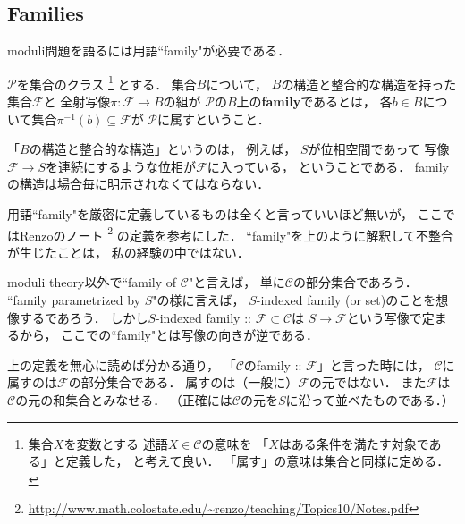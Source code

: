 \documentclass[a4paper]{jsarticle}
\newcommand{\famF}{\mathcal{F}}
\begin{document}
    \subsection{Families}
    moduli問題を語るには用語``family"が必要である．

    \begin{Def}
        $\mathcal{P}$を集合のクラス
        \footnote
        {
            集合$X$を変数とする
            述語$X \in \mathcal{C}$の意味を
            「$X$はある条件を満たす対象である」と定義した，
            と考えて良い．
            「属す」の意味は集合と同様に定める．
        }
        とする．
        集合$B$について，
        $B$の構造と整合的な構造を持った集合$\famF$と
        全射写像$\pi: \famF \to B$の組が
        $\mathcal{P}$の$B$上の\textbf{family}であるとは，
        各$b \in B$について集合$\pi^{-1}(b) \subseteq \famF$が
        $\mathcal{P}$に属すということ．
    \end{Def}
    「$B$の構造と整合的な構造」というのは，
    例えば，
    $S$が位相空間であって
    写像$\famF \to S$を連続にするような位相が$\famF$に入っている，
    ということである．
    familyの構造は場合毎に明示されなくてはならない．

    用語``family"を厳密に定義しているものは全くと言っていいほど無いが，
    ここではRenzoのノート
    \footnote{ \url{http://www.math.colostate.edu/~renzo/teaching/Topics10/Notes.pdf} }
    の定義を参考にした．
    ``family"を上のように解釈して不整合が生じたことは，
    私の経験の中ではない．

    \begin{Remark}
        moduli theory以外で``family of $\mathcal{C}$"と言えば，
        単に$\mathcal{C}$の部分集合であろう．
        ``family parametrized by $S$"の様に言えば，
        $S$-indexed family (or set)のことを想像するであろう．
        しかし$S$-indexed family :: $\famF \subset \mathcal{C}$は
        $S \to \famF$という写像で定まるから，
        ここでの``family"とは写像の向きが逆である．
        
        上の定義を無心に読めば分かる通り，
        「$\mathcal{C}$のfamily :: $\famF$」と言った時には，
        $\mathcal{C}$に属すのは$\famF$の部分集合である．
        属すのは（一般に）$\famF$の元ではない．
        また$\famF$は$\mathcal{C}$の元の和集合とみなせる．
        （正確には$\mathcal{C}$の元を$S$に沿って並べたものである．）
    \end{Remark}
\end{document}
